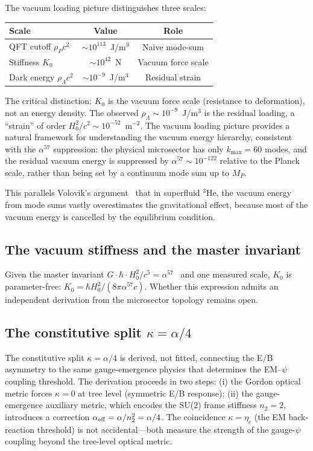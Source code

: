 \documentclass[aps,prd,twocolumn,superscriptaddress,nofootinbib]{revtex4-2}
\begin{document}
The vacuum loading picture distinguishes three scales:
\begin{center}
\begin{tabular}{lcc}
\toprule
\textbf{Scale} & \textbf{Value} & \textbf{Role} \\
\midrule
QFT cutoff $\rho_P c^2$ & $\sim 10^{113}$~J/m$^3$ & Naive mode-sum \\
Stiffness $K_0$ & $\sim 10^{42}$~N & Vacuum force scale \\
Dark energy $\rho_\Lambda c^2$ & $\sim 10^{-9}$~J/m$^3$ & Residual strain \\
\bottomrule
\end{tabular}
\end{center}

The critical distinction: $K_0$ is the vacuum force scale (resistance to
deformation), not an energy density.  The observed
$\rho_\Lambda \sim 10^{-9}$~J/m$^3$ is the residual loading, a
``strain'' of order $H_0^2/c^2 \sim 10^{-52}$~m$^{-2}$.  The vacuum
loading picture provides a natural framework for understanding the
vacuum energy hierarchy, consistent with the $\alpha^{57}$ suppression:
the physical microsector has only $k_{\max} = 60$ modes, and the
residual vacuum energy is suppressed by $\alpha^{57} \sim 10^{-122}$
relative to the Planck scale, rather than being set by a continuum
mode sum up to $M_P$.

This parallels Volovik's argument~\cite{Volovik2003} that in
superfluid $^3$He, the vacuum energy from mode sums vastly
overestimates the gravitational effect, because most of the vacuum
energy is cancelled by the equilibrium condition.

\subsection{The vacuum stiffness and the master invariant}

Given the master invariant $G\cdot\hbar\cdot H_0^2/c^5 =
\alpha^{57}$~\cite{Alcock2025AbInitio} and one measured scale, $K_0$
is parameter-free:
$K_0 = \hbar H_0^2/(8\pi\alpha^{57}c)$.  Whether this expression
admits an independent derivation from the microsector topology remains
open.

\subsection{The constitutive split $\kappa = \alpha/4$}

The constitutive split $\kappa = \alpha/4$ is derived, not fitted,
connecting the E/B asymmetry to the same gauge-emergence physics that
determines the EM--$\psi$ coupling threshold.  The derivation proceeds
in two steps: (i) the Gordon optical metric forces $\kappa = 0$ at
tree level (symmetric E/B response); (ii) the gauge-emergence auxiliary
metric, which encodes the SU(2) frame stiffness $n_2 = 2$, introduces
a correction $\alpha_{\rm eff} = \alpha/n_2^2 = \alpha/4$.  The
coincidence $\kappa = \eta_c$ (the EM back-reaction threshold) is not
accidental---both measure the strength of the gauge-$\psi$ coupling
beyond the tree-level optical metric.
\end{document}
